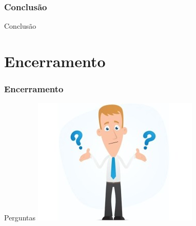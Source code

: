 \documentclass[]{beamer}
\begin{document}

	\begin{frame}[fragile, label=re]\frametitle{Conclusão}
		\begin{block}{Conclusão}
		
		\end{block}
	\end{frame}	


	\section{Encerramento}
	\begin{frame}[label=encerramento]
		\frametitle{Encerramento}
		\begin{block}{Perguntas}
			\centering
			\includegraphics[scale=0.6]{duvidas.jpg}\\
		\end{block}
	\end{frame}
\end{document}
